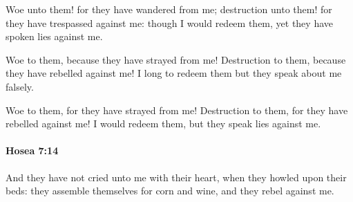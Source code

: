 			\begin{versebox}
					\item[BHS] 
					\item[LXX] 
					\item[ASV] Woe unto them! for they have wandered from me; destruction unto them! for they have trespassed against me: though I would redeem them, yet they have spoken lies against me.
					\item[NIV] Woe to them, because they have strayed from me! Destruction to them, because they have rebelled against me! I long to redeem them but they speak about me falsely.
					\item[NRSV] Woe to them, for they have strayed from me! Destruction to them, for they have rebelled against me! I would redeem them, but they speak lies against me.
			\end{versebox}

		\paragraph{Hosea 7:14} %
			\label{HOSEA-7-14}

			And they have not cried unto me with their heart, when they howled upon their beds: they assemble themselves for corn and wine, and they rebel against me.

